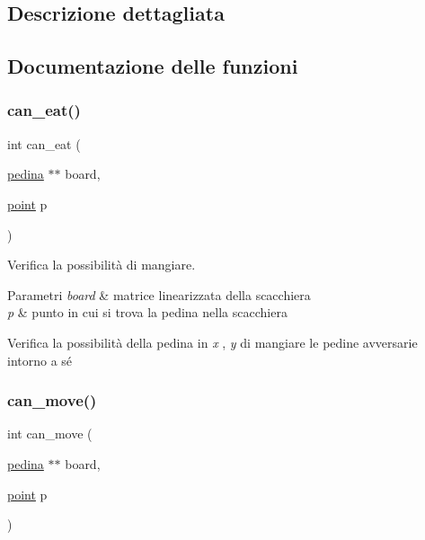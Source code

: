 \subsection{Descrizione dettagliata}


\subsection{Documentazione delle funzioni}
\mbox{\label{group__Logiche_gae47a85e51124bf1b5569559ba5718bb6}} 
\subsubsection{\texorpdfstring{can\+\_\+eat()}{can\_eat()}}
{\footnotesize\ttfamily int can\+\_\+eat (\begin{DoxyParamCaption}\item[{\hyperlink{ml__lib_8h_a71fee95122b31f5cb0b07d9c16ffa3a5}{pedina} $\ast$$\ast$}]{board,  }\item[{\hyperlink{structpunto}{point}}]{p }\end{DoxyParamCaption})}



Verifica la possibilità di mangiare. 


\begin{DoxyParams}{Parametri}
{\em board} & matrice linearizzata della scacchiera \\
\hline
{\em p} & punto in cui si trova la pedina nella scacchiera\\
\hline
\end{DoxyParams}
Verifica la possibilità della pedina in {\itshape x} , {\itshape y} di mangiare le pedine avversarie intorno a sé \mbox{\label{group__Logiche_ga8cc7e93c7f87a22d21412b3ca1f942e6}} 
\subsubsection{\texorpdfstring{can\+\_\+move()}{can\_move()}}
{\footnotesize\ttfamily int can\+\_\+move (\begin{DoxyParamCaption}\item[{\hyperlink{ml__lib_8h_a71fee95122b31f5cb0b07d9c16ffa3a5}{pedina} $\ast$$\ast$}]{board,  }\item[{\hyperlink{structpunto}{point}}]{p }\end{DoxyParamCaption})}



